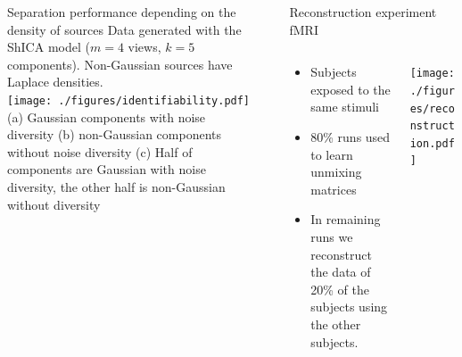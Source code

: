 \documentclass[final]{beamer}
\newlength{\sepwid}
\newlength{\onecolwid}
\newlength{\onecolwidtwo}
\newlength{\onecolwidthree}
\begin{document}
\begin{frame}[t]
\begin{columns}[t]
\begin{column}{\onecolwidtwo}
  \vspace{0.5em}
  \begin{block}{Separation performance depending on the density of sources}
    Data generated with the ShICA model ($m=4$ views, $k=5$ components). Non-Gaussian sources have Laplace densities.\\
    {
      \vspace{1em}
        \texttt{[image: ./figures/identifiability.pdf]}\\
          (a) Gaussian components with noise diversity
          (b) non-Gaussian components without noise diversity
          (c) Half of components are Gaussian with noise diversity, the other half is
          non-Gaussian without diversity
    }
  \end{block}


\end{column} %
\begin{column}{\sepwid}\end{column} %

\begin{column}{\onecolwidthree} %


    \begin{block}{Reconstruction experiment fMRI}
      \vspace{-0.5em}
      \begin{columns}
        \begin{column}{0.35 \textwidth}
          \begin{itemize}
          \item Subjects exposed to the same stimuli
          \item 80\% runs used to learn unmixing matrices
          \item In remaining runs we reconstruct the data of 20\% of the
            subjects using the other subjects.
          \end{itemize}
      \end{column}
      \begin{column}{0.65 \textwidth}
          \begin{center}
            \texttt{[image: ./figures/reconstruction.pdf]}
          \end{center}
      \end{column}
      \end{columns}
    \end{block}


\end{column}
\end{columns}
\end{frame}
\end{document}
